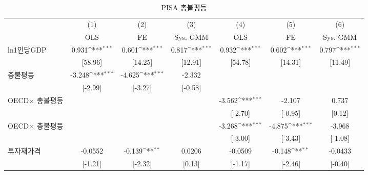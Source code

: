 \begin{table}[htbp]
\centering
\def\sym#1{\ifmmode^{#1}\else\(^{#1}\)\fi}
\caption{PISA 총불평등\label{tab:pisasimp}}
\begin{tabular}{l*{6}{c}}
\toprule
                    &\multicolumn{1}{c}{(1)}&\multicolumn{1}{c}{(2)}&\multicolumn{1}{c}{(3)}&\multicolumn{1}{c}{(4)}&\multicolumn{1}{c}{(5)}&\multicolumn{1}{c}{(6)}\\ &\multicolumn{1}{c}{OLS}&\multicolumn{1}{c}{FE}&\multicolumn{1}{c}{Sys. GMM}&\multicolumn{1}{c}{OLS}&\multicolumn{1}{c}{FE}&\multicolumn{1}{c}{Sys. GMM}\\
\midrule
ln1인당GDP        &       0.931\sym{***}&       0.601\sym{***}&       0.817\sym{***}&       0.932\sym{***}&       0.602\sym{***}&       0.797\sym{***}\\
                    &     [58.96]         &     [14.25]         &     [12.91]         &     [54.78]         &     [14.31]         &     [11.49]         \\
\addlinespace
총불평등          &      -3.248\sym{***}&      -4.625\sym{***}&      -2.332         &                     &                     &                     \\
                    &     [-2.99]         &     [-3.27]         &     [-0.58]         &                     &                     &                     \\
\addlinespace
OECD$ \times$ 총불평등&                     &                     &                     &      -3.562\sym{***}&      -2.107         &       0.737         \\
                    &                     &                     &                     &     [-2.70]         &     [-0.95]         &      [0.12]         \\
\addlinespace
OECD$ \times$ 총불평등&                     &                     &                     &      -3.268\sym{***}&      -4.875\sym{***}&      -3.968         \\
                    &                     &                     &                     &     [-3.00]         &     [-3.43]         &     [-1.08]         \\
\addlinespace
투자재가격        &     -0.0552         &      -0.139\sym{**} &      0.0206         &     -0.0509         &      -0.148\sym{**} &     -0.0433         \\
                    &     [-1.21]         &     [-2.32]         &      [0.13]         &     [-1.17]         &     [-2.46]         &     [-0.40]         \\

\end{tabular}
\end{table}
